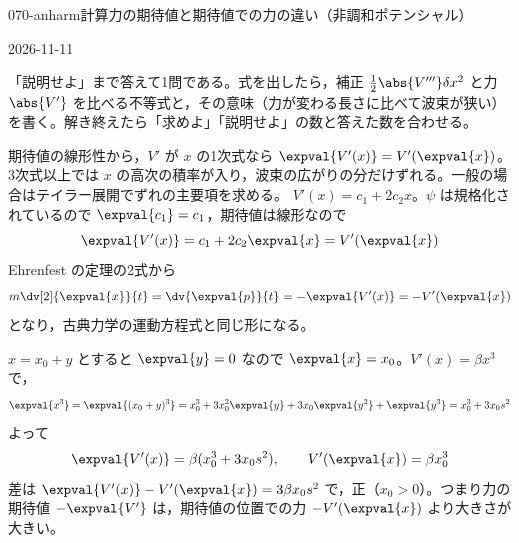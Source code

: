 \documentclass[uplatex,dvipdfmx,a4paper,11pt]{jsarticle}
\begin{document}
\begin{mondai}{070-anharm}{計算}{力の期待値と期待値での力の違い（非調和ポテンシャル）}
\begin{kotaeutsushi}{2026-11-11}
\end{kotaeutsushi}
\begin{kizuki}
\item {} 「説明せよ」まで答えて1問である。式を出したら，補正 $\frac{1}{2}\abs{V'''}\delta x^{2}$ と力 $\abs{V'}$ を比べる不等式と，その意味（力が変わる長さに比べて波束が狭い）を書く。解き終えたら「求めよ」「説明せよ」の数と答えた数を合わせる。
\end{kizuki}
\begin{tadashii}
\houshin 期待値の線形性から，$V'$ が $x$ の1次式なら $\expval{V'(x)}=V'(\expval{x})$。3次式以上では $x$ の高次の積率が入り，波束の広がりの分だけずれる。一般の場合はテイラー展開でずれの主要項を求める。
\keisan {} $V'(x)=c_{1}+2c_{2}x$。$\psi$ は規格化されているので $\expval{c_{1}}=c_{1}$，期待値は線形なので
\[ \expval{V'(x)}=c_{1}+2c_{2}\expval{x}=V'(\expval{x}) \]
Ehrenfest の定理の2式から
\[ m\dv[2]{\expval{x}}{t}=\dv{\expval{p}}{t}=-\expval{V'(x)}=-V'(\expval{x}) \]
となり，古典力学の運動方程式と同じ形になる。

 $x=x_{0}+y$ とすると $\expval{y}=0$ なので $\expval{x}=x_{0}$。$V'(x)=\beta x^{3}$ で，
\[ \expval{x^{3}}=\expval{(x_{0}+y)^{3}}=x_{0}^{3}+3x_{0}^{2}\expval{y}+3x_{0}\expval{y^{2}}+\expval{y^{3}}=x_{0}^{3}+3x_{0}s^{2} \]
よって
\[ \expval{V'(x)}=\beta(x_{0}^{3}+3x_{0}s^{2}),\qquad V'(\expval{x})=\beta x_{0}^{3} \]
差は $\expval{V'(x)}-V'(\expval{x})=3\beta x_{0}s^{2}$ で，正（$x_{0}>0$）。つまり力の期待値 $-\expval{V'}$ は，期待値の位置での力 $-V'(\expval{x})$ より大きさが大きい。


\end{tadashii}
\end{mondai}
\end{document}
